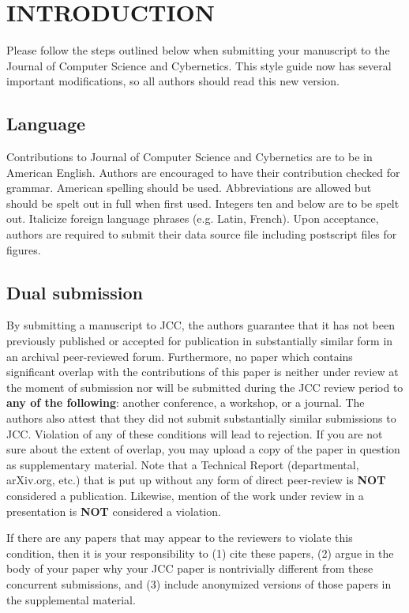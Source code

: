 
\section{INTRODUCTION}

Please follow the steps outlined below when submitting your manuscript to the Journal of Computer Science and Cybernetics. This style guide now has several important modifications, so all authors should read this new version.
\subsection{Language}
Contributions to Journal of Computer Science and Cybernetics are to be in American English. Authors are encouraged to have their contribution checked for grammar. American spelling should be used. Abbreviations are allowed but should be spelt out in full when first used. Integers ten and below are to be spelt out. Italicize foreign language phrases (e.g. Latin, French). Upon acceptance, authors are required to submit their data source file including postscript files for figures.
\subsection{Dual submission}
By submitting a manuscript to JCC, the authors guarantee that it has not been previously published or accepted for publication in substantially similar form in an archival peer-reviewed forum. Furthermore, no paper which contains significant overlap with the contributions of this paper is neither under review at the moment of submission nor will be submitted during the JCC review period to \textbf{any of the following}: another conference, a workshop, or a journal. The authors also attest that they did not submit substantially similar submissions to JCC. Violation of any of these conditions will lead to rejection. If you are not sure about the extent of overlap, you may upload a copy of the paper in question as supplementary material. Note that a Technical Report (departmental, arXiv.org, etc.) that is put up without any form of direct peer-review is \textbf{NOT} considered a publication. Likewise, mention of the work under review in a presentation is \textbf{NOT} considered a violation.

If there are any papers that may appear to the reviewers to violate this condition, then it is your responsibility to (1) cite these papers, (2) argue in the body of your paper why your JCC paper is nontrivially different from these concurrent submissions, and (3) include anonymized versions of those papers in the supplemental material.
